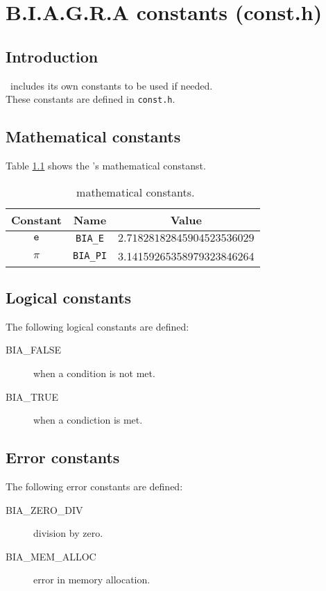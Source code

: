 %
%

\chapter{B.I.A.G.R.A constants (const.h)}

\section{Introduction}

\BI \ includes its own constants to be used if needed.\\

These constants are defined in \texttt{const.h}.

\section{Mathematical constants} \label{sec:mathematicalConsts}

Table \ref{tab:mathematicalConsts} shows the \BI's mathematical constanst.

\begin{table}[!h]
  \begin{center}
  \begin{tabular}{|c|c|c|}
    \hline
    \textbf{Constant} & \textbf{Name} & \textbf{Value} \\
    \hline
    $\texttt{e}$ & \texttt{BIA\_E} & $2.71828182845904523536029$ \\
    \hline
    $\pi$ & \texttt{BIA\_PI} & 3.14159265358979323846264 \\
    \hline
  \end{tabular}
  \end{center}
\caption{\BI\ mathematical constants.} \label{tab:mathematicalConsts}
\end{table}

\FloatBarrier

\section{Logical constants}

The following logical constants are defined:

\begin{description}
\item[BIA\_FALSE] when a condition is not met.
\item[BIA\_TRUE] when a condiction is met.
\end{description}

\section{Error constants}

The following error constants are defined:

\begin{description}
\item[BIA\_ZERO\_DIV] division by zero.
\item[BIA\_MEM\_ALLOC] error in memory allocation.
\end{description}
